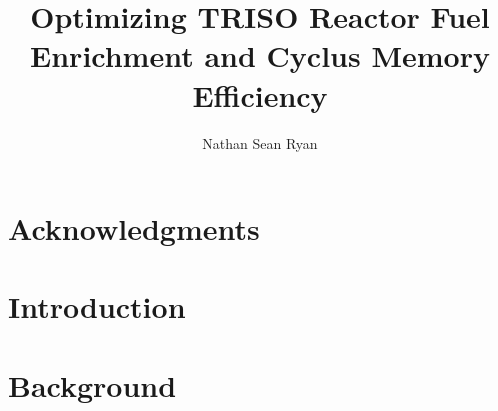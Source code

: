 \documentclass[edeposit,fullpage]{uiucthesis2018}
\title{Optimizing TRISO Reactor Fuel Enrichment and Cyclus Memory Efficiency}
\author{Nathan Sean Ryan}
\begin{document}
\maketitle

\frontmatter
\begin{abstract}



\end{abstract}

\chapter*{Acknowledgments}




\tableofcontents
\listoftables
\listoffigures


\pagebreak
\mainmatter

\chapter{Introduction}
\label{ch:introduction}




\chapter{Background}
\label{ch:background}
\end{document}

